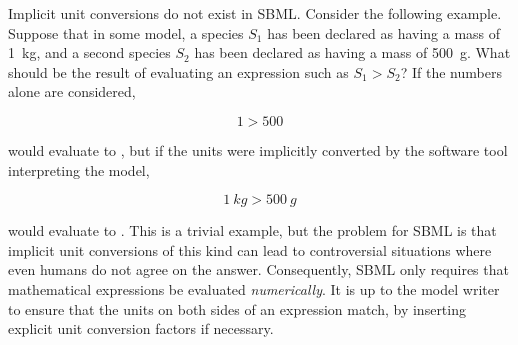 Implicit unit conversions do not exist in SBML.  Consider the
following example.  Suppose that in some model, a species $S_1$
has been declared as having a mass of 1~kg, and a second species
$S_2$ has been declared as having a mass of 500~g.  What should be
the result of evaluating an expression such as $S_1 > S_2$?  If
the numbers alone are considered,
\begin{linenomath}
  \begin{equation*}
    1 > 500
  \end{equation*}
\end{linenomath}
would evaluate to , but if the units were implicitly
converted by the software tool interpreting the model,
\begin{linenomath}
  \begin{equation*}
    1~kg > 500~g
  \end{equation*}
\end{linenomath}
would evaluate to .  This is a trivial example, but the
problem for SBML is that implicit unit conversions of this kind
can lead to controversial situations where even humans do not
agree on the answer.  Consequently, SBML only requires that
mathematical expressions be evaluated \emph{numerically}.  It is
up to the model writer to ensure that the units on both sides of
an expression match, by inserting explicit unit conversion factors
if necessary.

